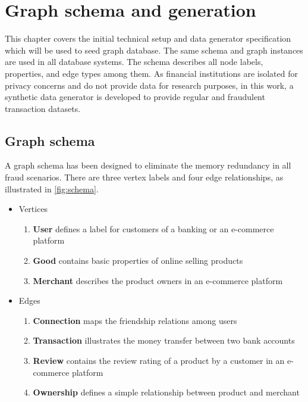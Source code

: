 \chapter{Graph schema and generation}

This chapter covers the initial technical setup and data generator specification which  will be used to seed graph database.
The same schema and graph instances are used in all database systems.
The schema describes all node labels, properties, and edge types among them.
As financial institutions are isolated for privacy concerns and do not provide data for research purposes, in this work, a synthetic data generator is developed to provide regular and fraudulent transaction datasets.

\section{Graph schema}

A graph schema has been designed to eliminate the memory redundancy in all fraud scenarios.
There are three vertex labels and four edge relationships, as illustrated in \autoref{fig:schema}.

\begin{itemize}
    \item {Vertices}
    \begin{enumerate}
        \item \textbf{User} defines a label for customers of a banking or an e-commerce platform
        \item \textbf{Good} contains basic properties of online selling products 
        \item \textbf{Merchant} describes the product owners in an e-commerce platform
    \end{enumerate} 
    
    \item {Edges}
    \begin{enumerate}
        \item \textbf{Connection} maps the friendship relations among users
        \item \textbf{Transaction} illustrates the money transfer between two bank accounts
        \item \textbf{Review} contains the review rating of a product by a customer in an e-commerce platform
        \item \textbf{Ownership} defines a simple relationship between product and merchant
    \end{enumerate}
\end{itemize}

